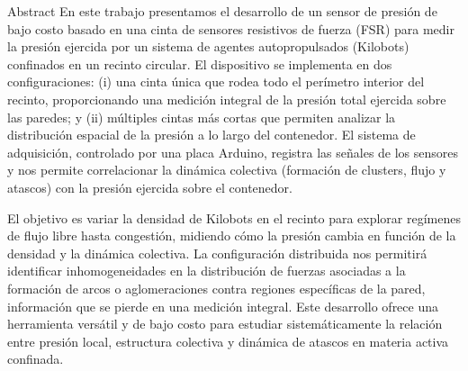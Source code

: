 \documentclass[portrait,a0paper,fontscale=0.292]{baposter}
\begin{document}
\begin{poster}
\begin{posterbox}[name=abstract,column=0,height=auto,span=6]{{Abstract}}
En este trabajo presentamos el desarrollo de un sensor de presión de bajo costo basado en una cinta de sensores resistivos de fuerza (FSR) para medir la presión ejercida por un sistema de agentes autopropulsados (Kilobots) confinados en un recinto circular. El dispositivo se implementa en dos configuraciones: (i) una cinta única que rodea todo el perímetro interior del recinto, proporcionando una medición integral de la presión total ejercida sobre las paredes; y (ii) múltiples cintas más cortas que permiten analizar la distribución espacial de la presión a lo largo del contenedor. El sistema de adquisición, controlado por una placa Arduino, registra las señales de los sensores y nos permite correlacionar la dinámica colectiva (formación de clusters, flujo y atascos) con la presión ejercida sobre el contenedor.

El objetivo es variar la densidad de Kilobots en el recinto para explorar regímenes de flujo libre hasta congestión, midiendo cómo la presión cambia en función de la densidad y la dinámica colectiva. La configuración distribuida nos permitirá identificar inhomogeneidades en la distribución de fuerzas asociadas a la formación de arcos o aglomeraciones contra regiones específicas de la pared, información que se pierde en una medición integral. Este desarrollo ofrece una herramienta versátil y de bajo costo para estudiar sistemáticamente la relación entre presión local, estructura colectiva y dinámica de atascos en materia activa confinada.
\end{posterbox}


\end{poster}
\end{document}
